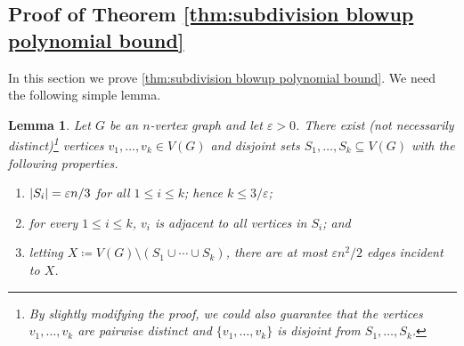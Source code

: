 \documentclass[reqno, english, 12pt]{amsart}
\theoremstyle{plain}
\newtheorem{lemma}[theorem]{Lemma}
\theoremstyle{remark}
\DeclarePairedDelimiter{\abs}{\lvert}{\rvert}
\renewcommand{\leq}{\leqslant}
\begin{document}
\subsection{Proof of Theorem \ref{thm:subdivision blowup polynomial bound}}
In this section we prove \cref{thm:subdivision blowup polynomial bound}.
We need the following simple lemma.
\begin{lemma}\label{lem:pull out vtxs}
	Let $G$ be an $n$-vertex graph and let $\varepsilon>0$. There exist (not necessarily distinct)\footnote{By slightly modifying the proof, we could also guarantee that the vertices $v_1,\dots,v_k$ are pairwise distinct and $\{v_1,\dots,v_{k}\}$ is disjoint from $S_1,\dots,S_k$.} vertices $v_1,\dots,v_k \in V(G)$ and disjoint sets $S_1,\dots,S_k \subseteq V(G)$ with the following properties.
	\begin{enumerate}
		\item $\abs{S_i} = \varepsilon n/3$ for all $1\leq i \leq k$; hence $k \leq 3/\varepsilon$;
		\item for every $1 \leq i \leq k$, $v_i$ is adjacent to all vertices in $S_i$; and
		\item letting $X \coloneqq V(G) \setminus (S_1 \cup \dotsb \cup S_k)$, there are at most $\varepsilon n^2/2$ edges incident to $X$.
	\end{enumerate}
\end{lemma}
\end{document}
